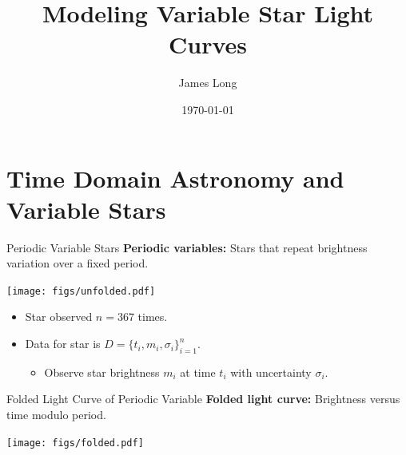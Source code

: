 \documentclass[12pt]{beamer}
\title{Modeling Variable Star Light Curves}
\author{James Long}
\date{\today}
\begin{document}
\frame{\titlepage}

\frame{\tableofcontents}





\section{Time Domain Astronomy and Variable Stars}

\begin{frame}{Periodic Variable Stars}
\textbf{Periodic variables:} Stars that repeat brightness variation over a fixed period.
\begin{center}
\texttt{[image: figs/unfolded.pdf]}
\end{center}
\begin{itemize}
\item Star observed $n=367$ times.
\item Data for star is $D=\{t_i,m_i,\sigma_i\}_{i=1}^n$.
\begin{itemize}
\item Observe star brightness $m_i$ at time $t_i$ with uncertainty $\sigma_i$.
\end{itemize}
\end{itemize}
\end{frame}


\begin{frame}{Folded Light Curve of Periodic Variable}
\textbf{Folded light curve:} Brightness versus time modulo period.
\begin{center}
\texttt{[image: figs/folded.pdf]}
\end{center}
\end{frame}
\end{document}
